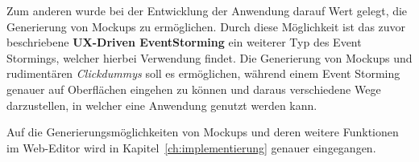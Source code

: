 Zum anderen wurde bei der Entwicklung der Anwendung darauf Wert gelegt, die Generierung von Mockups zu ermöglichen.
Durch diese Möglichkeit ist das zuvor beschriebene \textbf{UX-Driven EventStorming} ein weiterer Typ des Event Stormings, welcher hierbei Verwendung findet.
Die Generierung von Mockups und rudimentären \textit{Clickdummys} soll es ermöglichen, während einem Event Storming genauer auf Oberflächen eingehen zu können
und daraus verschiedene Wege darzustellen, in welcher eine Anwendung genutzt werden kann.

Auf die Generierungsmöglichkeiten von Mockups und deren weitere Funktionen im Web-Editor wird in Kapitel~\ref{ch:implementierung} genauer eingegangen.

